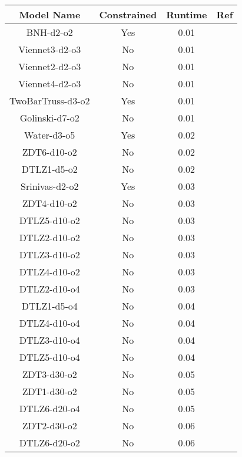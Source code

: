\documentclass[10pt,journal,cspaper,compsoc]{IEEEtran}
\begin{document}
\begin{figure}
\begin{center}
\small	
\begin{tabular}{|c	|	c	|	c	|	c	|} \hline
Model Name	&	Constrained	&	Runtime	&	Ref	 \\ \hline
BNH-d2-o2	&	Yes	&	0.01	&	\cite{Binh97mobes:a} 	\\	
Viennet3-d2-o3	&	No	&	0.01	&	\cite{viennetmodels} 	\\	
Viennet2-d2-o3	&	No	&	0.01	&	\cite{viennetmodels} 	\\	
Viennet4-d2-o3	&	No	&	0.01	&	\cite{viennetmodels} 	\\	
TwoBarTruss-d3-o2	&	Yes	&	0.01	&	\cite{Chafekar03constrainedmultiobjective} 	\\	
Golinski-d7-o2	&	No	&	0.01	&	\cite{golinskimodel} 	\\	
Water-d3-o5   	&	Yes	&	0.02	&	\cite{watermodel} 	\\	
ZDT6-d10-o2   	&	No	&	0.02	&	\cite{Zitzler2000zdtpaper} 	\\	
DTLZ1-d5-o2   	&	No	&	0.02	&	\cite{dtlz2001a}	\\	
Srinivas-d2-o2	&	Yes	&	0.03	&	\cite{DBLP:journals/ec/SrinivasD94} 	\\	
ZDT4-d10-o2   	&	No	&	0.03	&	\cite{Zitzler2000zdtpaper} 	\\	
DTLZ5-d10-o2  	&	No	&	0.03	&	\cite{dtlz2001a}	\\	
DTLZ2-d10-o2  	&	No	&	0.03	&	\cite{dtlz2001a}	\\	
DTLZ3-d10-o2  	&	No	&	0.03	&	\cite{dtlz2001a}	\\	
DTLZ4-d10-o2  	&	No	&	0.03	&	\cite{dtlz2001a}	\\	
DTLZ2-d10-o4  	&	No	&	0.03	&	\cite{dtlz2001a}	\\	
DTLZ1-d5-o4   	&	No	&	0.04	&	\cite{dtlz2001a}	\\	
DTLZ4-d10-o4  	&	No	&	0.04	&	\cite{dtlz2001a}	\\	
DTLZ3-d10-o4  	&	No	&	0.04	&	\cite{dtlz2001a}	\\	
DTLZ5-d10-o4  	&	No	&	0.04	&	\cite{dtlz2001a}	\\	
ZDT3-d30-o2   	&	No	&	0.05	&	\cite{Zitzler2000zdtpaper} 	\\	
ZDT1-d30-o2   	&	No	&	0.05	&	\cite{Zitzler2000zdtpaper} 	\\	
DTLZ6-d20-o4  	&	No	&	0.05	&	\cite{dtlz2001a}	\\	
ZDT2-d30-o2   	&	No	&	0.06	&	\cite{Zitzler2000zdtpaper} 	\\	
DTLZ6-d20-o2  	&	No	&	0.06	&	\cite{dtlz2001a}	\\	

\end{tabular}
\end{center}
\end{figure}
\end{document}
